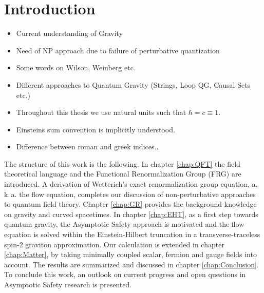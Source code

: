 \chapter{Introduction}
\begin{itemize}
	\item Current understanding of Gravity
	\item Need of NP approach due to failure of perturbative quantization
	\item Some words on Wilson, Weinberg etc.
	\item Different approaches to Quantum Gravity (Strings, Loop QG, Causal Sets etc.)
	\item Throughout this thesis we use natural units such that $\hbar = c  \equiv 1$.
	\item Einsteins sum convention is implicitly understood.
	\item Difference between roman and greek indices..
\end{itemize}

The structure of this work is the following. In chapter \ref{chap:QFT} the field theoretical language and the Functional Renormalization Group (FRG) are introduced. A derivation of Wetterich's exact renormalization group equation, a.\,k.\,a. the flow equation,  completes our discussion of non-perturbative approaches to quantum field theory. Chapter \ref{chap:GR} provides the background knowledge on gravity and curved spacetimes. In chapter \ref{chap:EHT}, as a first step towards quantum gravity, the Asymptotic Safety approach is motivated and the flow equation is solved within the Einstein-Hilbert truncation in a transverse-traceless spin-2 graviton approximation. Our calculation is extended in chapter \ref{chap:Matter}, by taking minimally coupled scalar, fermion and gauge fields into account.
The results are summarized and discussed in chapter \ref{chap:Conclusion}. To conclude this work, an outlook on current progress and open questions in Asymptotic Safety research is presented.